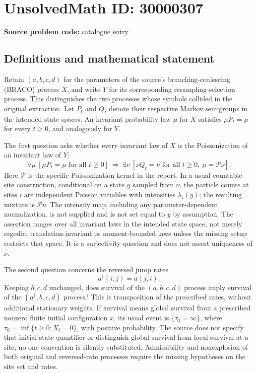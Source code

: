 \documentclass[11pt]{article}
\begin{document}
\section*{UnsolvedMath ID: 30000307}
\textbf{Source problem code:} catalogue entry
\subsection{Definitions and mathematical statement}
Retain \((a,b,c,d)\) for the parameters of the source's branching-coalescing (BRACO) process \(X\), and write \(Y\) for its corresponding resampling-selection process. This distinguishes the two processes whose symbols collided in the original extraction. Let \(P_t\) and \(Q_t\) denote their respective Markov semigroups in the intended state spaces. An invariant probability law \(\mu\) for \(X\) satisfies \(\mu P_t=\mu\) for every \(t\geq0\), and analogously for \(Y\).

The first question asks whether every invariant law of \(X\) is the Poissonization of an invariant law of \(Y\):
\[
 \forall\mu\ [\mu P_t=\mu\text{ for all }t\geq0]
 \ \Longrightarrow\ \exists\nu\ [\nu Q_t=\nu\text{ for all }t\geq0,
 \ \mu=\mathcal P\nu].
\]
Here \(\mathcal P\) is the specific Poissonization kernel in the report. In a usual countable-site construction, conditional on a state \(y\) sampled from \(\nu\), the particle counts at sites \(i\) are independent Poisson variables with intensities \(\lambda_i(y)\); the resulting mixture is \(\mathcal P\nu\). The intensity map, including any parameter-dependent normalization, is not supplied and is not set equal to \(y\) by assumption. The assertion ranges over all invariant laws in the intended state space, not merely ergodic, translation-invariant or moment-bounded laws unless the missing setup restricts that space. It is a surjectivity question and does not assert uniqueness of \(\nu\).

The second question concerns the reversed jump rates
\[
 a^\dagger(i,j)=a(j,i).
\]
Keeping \(b,c,d\) unchanged, does survival of the \((a,b,c,d)\) process imply survival of the \((a^\dagger,b,c,d)\) process? This is transposition of the prescribed rates, without additional stationary weights. If survival means global survival from a prescribed nonzero finite initial configuration \(x\), its usual event is \(\{\tau_0=\infty\}\), where \(\tau_0=\inf\{t\geq0:X_t=0\}\), with positive probability. The source does not specify that initial-state quantifier or distinguish global survival from local survival at a site; no one convention is silently substituted. Admissibility and nonexplosion of both original and reversed-rate processes require the missing hypotheses on the site set and rates.
\end{document}
